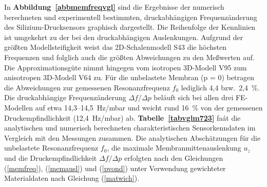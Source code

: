 In {\bf Abbildung~\ref{abbmemfreqvgl}} sind die Ergebnisse
der numerisch berechneten und experimentell bestimmten, druckabhängigen
Frequenzänderung des Silizium-Drucksensors graphisch dargestellt.
Die Reihenfolge der Kennlinien ist umgekehrt zu der bei den druckabhängigen
Auslenkungen. Aufgrund der größten Modellsteifigkeit weist das
2D-Schalenmodell S43 die höchsten Frequenzen und folglich auch die größten
Abweichungen zu den Meßwerten auf. Die Approximationsgüte nimmt hingegen
vom isotropen 3D-Modell V95 zum anisotropen 3D-Modell V64 zu. Für die
unbelastete Membran (p = 0) betragen die Abweichungen zur gemessenen
Resonanzfrequenz $f_{0}$ lediglich 4,4 bzw.\ 2,4~\%. Die druckabhängige
Frequenzänderung $\Delta f$/$\Delta p$ beläuft sich bei allen drei
FE-Modellen auf etwa 14,3--14,5~Hz/mbar und weicht rund 16~\% von der
gemessenen Druckempfindlichkeit (12,4~Hz/mbar) ab.
{\bf Tabelle~\ref{tabvglm723}} faát die analytischen und numerisch
berechneten charakteristischen Sensorkenndaten im Vergleich
mit den Messungen zusammen. Die analytischen Abschätzungen für die
unbelastete Resonanzfrequenz $f_{0}$,
die maximale Membranmittenauslenkung $u_{z}$ und
die Druckempfindlichkeit $\Delta f / \Delta p$ erfolgten nach den
Gleichungen (\ref{memfreq}), (\ref{memausl}) und (\ref{pvond}) unter
Verwendung gewichteter Materialdaten nach Gleichung (\ref{matwich}).
